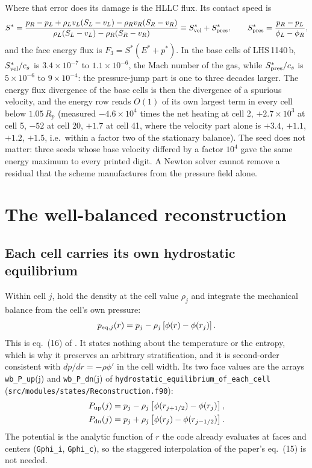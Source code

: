 \documentclass[english,a4paper]{my_memo}
\begin{document}
Where that error does its damage is the HLLC flux. Its contact speed is
\begin{equation}
  S^{*} = \frac{p_R - p_L + \rho_L v_L (S_L - v_L) - \rho_R v_R (S_R - v_R)}
               {\rho_L (S_L - v_L) - \rho_R (S_R - v_R)}
        \equiv S^{*}_{\rm vel} + S^{*}_{\rm pres},
  \qquad
  S^{*}_{\rm pres} = \frac{p_R - p_L}{\phi_L - \phi_R},
  \label{eq:sstar}
\end{equation}
and the face energy flux is $F_3 = S^{*}(E^{*} + p^{*})$. In the base cells
of LHS\,1140\,b, $S^{*}_{\rm vel}/c_s$ is $3.4\times10^{-7}$ to
$1.1\times10^{-6}$, the Mach number of the gas, while $S^{*}_{\rm pres}/c_s$ is
$5\times10^{-6}$ to $9\times10^{-4}$: the pressure-jump part is one to three
decades larger. The energy flux divergence of the base cells is then the
divergence of a spurious velocity, and the energy row reads $O(1)$ of its own
largest term in every cell below $1.05\,R_p$ (measured $-4.6\times10^{4}$
times the net heating at cell 2, $+2.7\times10^{3}$ at cell 5, $-52$ at cell
20, $+1.7$ at cell 41, where the velocity part alone is $+3.4$, $+1.1$, $+1.2$,
$+1.5$, i.e.\ within a factor two of the stationary balance). The seed does
not matter: three seeds whose base velocity differed by a factor $10^{4}$
gave the same energy maximum to every printed digit. A Newton solver cannot
remove a residual that the scheme manufactures from the pressure field alone.

\section{The well-balanced reconstruction}

\subsection{Each cell carries its own hydrostatic equilibrium}

Within cell $j$, hold the density at the cell value $\rho_j$ and integrate the
mechanical balance from the cell's own pressure:
\begin{equation}
  p_{{\rm eq},j}(r) = p_j - \rho_j\left[\phi(r) - \phi(r_j)\right].
  \label{eq:peq}
\end{equation}
This is eq.\ (16) of \citet{Kappeli2016}. It states nothing about the
temperature or the entropy, which is why it preserves an arbitrary
stratification, and it is second-order consistent with $dp/dr = -\rho\phi'$
in the cell width. Its two face values are the arrays \texttt{wb\_P\_up}(j)
and \texttt{wb\_P\_dn}(j) of \texttt{hydrostatic\_equilibrium\_of\_each\_cell}
(\texttt{src/modules/states/Reconstruction.f90}):
\begin{align}
  P_{\rm up}(j) &= p_j - \rho_j\left[\phi(r_{j+1/2}) - \phi(r_j)\right], \\
  P_{\rm dn}(j) &= p_j + \rho_j\left[\phi(r_j) - \phi(r_{j-1/2})\right].
\end{align}
The potential is the analytic function of $r$ the code already evaluates at
faces and centers (\texttt{Gphi\_i}, \texttt{Gphi\_c}), so the staggered
interpolation of the paper's eq.\ (15) is not needed.
\end{document}
